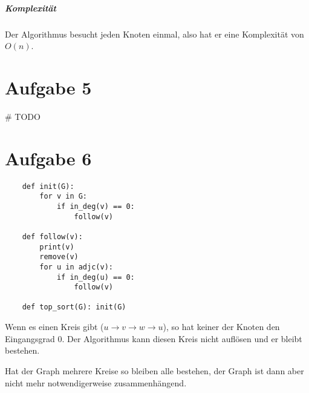 \documentclass[a4paper,10pt]{scrartcl}
\begin{document}
\subparagraph{Komplexität}

Der Algorithmus besucht jeden Knoten einmal, also hat er eine Komplexität von $O(n)$.

\section*{Aufgabe 5}

\# TODO

\section*{Aufgabe 6}

\begin{verbatim}
    def init(G):
        for v in G:
            if in_deg(v) == 0:
                follow(v)

    def follow(v):
        print(v)
        remove(v)
        for u in adjc(v):
            if in_deg(u) == 0:
                follow(v)

    def top_sort(G): init(G)
\end{verbatim}

Wenn es einen Kreis gibt ($u \rightarrow v \rightarrow w \rightarrow u$), so hat keiner der Knoten den Eingangsgrad 0.
Der Algorithmus kann diesen Kreis nicht auflösen und er bleibt bestehen.

Hat der Graph mehrere Kreise so bleiben alle bestehen,
der Graph ist dann aber nicht mehr notwendigerweise zusammenhängend.
\end{document}

